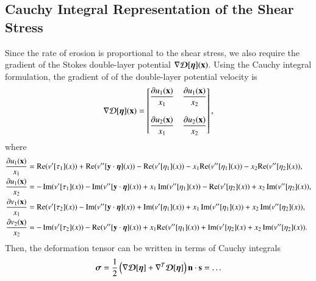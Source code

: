 \documentclass[preprint, 10pt]{elsarticle}
\newcommand{\D}{\mbox{${\mathcal D}$}}
\begin{document}
\subsection{Cauchy Integral Representation of the Shear Stress}
Since the rate of erosion is proportional to the shear stress, we also
require the gradient of the Stokes double-layer potential $\nabla
{\boldsymbol{\mathcal D}}[{\boldsymbol\eta}]({\mathbf{x}})$.  Using the Cauchy integral formulation, the gradient
of of the double-layer potential velocity is
{\color{red}
\begin{align}
 \nabla\D[\eeta] (\xx)=
\left[
\begin{matrix}
\displaystyle\frac{\partial u_1(\xx)}{x_1} & \displaystyle\frac{\partial u_1(\xx)}{x_2}\\ \\
\displaystyle\frac{\partial u_2(\xx)}{x_1} & \displaystyle\frac{\partial u_2(\xx)}{x_2}
\end{matrix}
\right],
\end{align}
where 
\begin{align}
\frac{\partial u_1({\mathbf{x}})}{x_1}&= {\mathrm{Re}} (v'[\tau_1](x)) + {\mathrm{Re}} (v''[{\mathbf{y}}\cdot{\boldsymbol\eta}](x)) 
           -{\mathrm{Re}} (v'[\eta_1](x)) -x_1{\mathrm{Re}} (v''[\eta_1](x))-x_2{\mathrm{Re}} (v''[\eta_2](x)),\\
\frac{\partial u_1({\mathbf{x}})}{x_2}&= - \operatorname{Im} (v'[\tau_1](x)) 
      - \operatorname{Im} (v''[{\mathbf{y}}\cdot{\boldsymbol\eta}](x)) 
       +x_1\operatorname{Im} (v''[\eta_1](x)) 
       -{\mathrm{Re}} (v'[\eta_2](x))
      +x_2\operatorname{Im} (v''[\eta_2](x)),\\
\frac{\partial v_1({\mathbf{x}})}{x_1}&= {\mathrm{Re}} (v'[\tau_2](x)) 
      -\operatorname{Im} (v''[{\mathbf{y}}\cdot{\boldsymbol\eta}](x)) 
       +\operatorname{Im} (v'[\eta_1](x))
       +x_1\operatorname{Im} (v''[\eta_1](x)) 
      +x_2\operatorname{Im} (v''[\eta_2](x)),\\
\frac{\partial v_2({\mathbf{x}})}{x_2}&= -\operatorname{Im} (v'[\tau_2](x)) 
      -{\mathrm{Re}} (v''[{\mathbf{y}}\cdot{\boldsymbol\eta}](x)) 
       +x_1{\mathrm{Re}} (v''[\eta_1](x)) 
      +\operatorname{Im} (v'[\eta_2](x)
      +x_2\operatorname{Im} (v''[\eta_2](x)).
\end{align}
}
Then, the deformation tensor can be written in terms of Cauchy integrals
\begin{align}
  {\boldsymbol\sigma} = \frac{1}{2} 
    \left(\nabla {\boldsymbol{\mathcal D}}[{\boldsymbol\eta}] + \nabla^T {\boldsymbol{\mathcal D}}[{\boldsymbol\eta}] \right) 
      {\mathbf{n}} \cdot {\mathbf{s}} = \ldots
\end{align}
\end{document}
